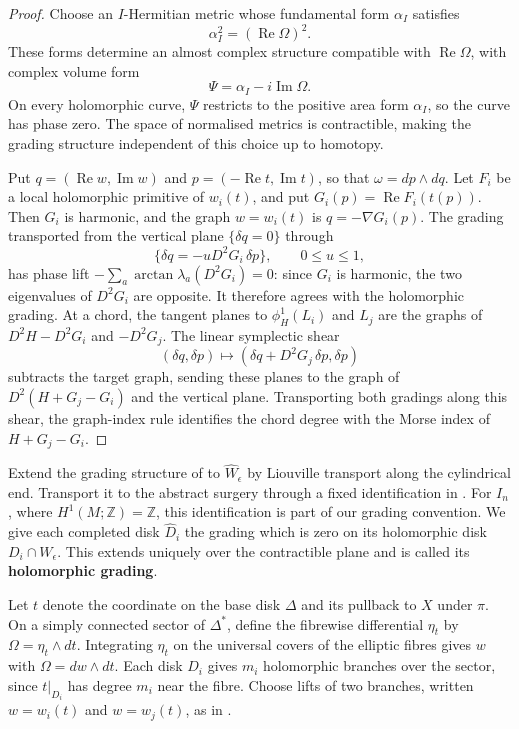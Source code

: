 \documentclass[a4paper]{amsart}
\newcommand{\ZZ}{\mathbb{Z}}
\DeclareMathOperator{\Ree}{Re}
\renewcommand{\Im}{\operatorname{Im}}
\numberwithin{equation}{section}
\begin{document}
\begin{proof}
Choose an $I$-Hermitian metric whose fundamental form $\alpha_I$ satisfies
\[
 \alpha_I^2=(\Ree\Omega)^2.
\]
These forms determine an almost complex structure compatible with
$\Ree\Omega$, with complex volume form
\[
 \Psi=\alpha_I-i\Im\Omega.
\]
On every holomorphic curve, $\Psi$ restricts to the positive area form
$\alpha_I$, so the curve has phase zero. The space of normalised metrics
is contractible, making the grading structure independent of this choice
up to homotopy.

Put $q=(\Ree w,\Im w)$ and $p=(-\Ree t,\Im t)$, so that
$\omega=dp\wedge dq$. Let $F_i$ be a local holomorphic primitive of
$w_i(t)$, and put $G_i(p)=\Ree F_i(t(p))$. Then $G_i$ is harmonic,
and the graph $w=w_i(t)$ is $q=-\nabla G_i(p)$.
The grading transported from the vertical plane $\{\delta q=0\}$ through
\[
 \{\delta q=-uD^2G_i\,\delta p\},\qquad 0\leq u\leq1,
\]
has phase lift $-\sum_a\arctan\lambda_a(D^2G_i)=0$: since $G_i$ is
harmonic, the two eigenvalues of $D^2G_i$ are opposite. It therefore
agrees with the holomorphic grading.
At a chord, the tangent planes to $\phi_H^1(L_i)$ and $L_j$ are
the graphs of $D^2H-D^2G_i$ and $-D^2G_j$. The linear symplectic shear
\[
 (\delta q,\delta p)\longmapsto
 (\delta q+D^2G_j\,\delta p,\delta p)
\]
subtracts the target graph, sending these planes to the graph of
$D^2(H+G_j-G_i)$ and the vertical plane. Transporting both gradings
along this shear, the graph-index rule
\cite[Section~2d, (iii)--(v)]{SeidelGraded} identifies the chord degree
with the Morse index of $H+G_j-G_i$.
\end{proof}

Extend the grading structure of  to
$\widehat W_\epsilon$ by Liouville transport along the cylindrical end.
Transport it to the abstract surgery through a fixed
identification in . For $I_n$, where
$H^1(M;\ZZ)=\ZZ$, this identification is part of our grading convention.
We give each completed disk $\widehat D_i$ the grading which is zero
on its holomorphic disk $D_i\cap W_\epsilon$. This extends uniquely
over the contractible plane and is called its \textbf{holomorphic grading}.

Let $t$ denote the coordinate on the base disk $\Delta$ and its
pullback to $X$ under $\pi$. On a simply connected sector of $\Delta^*$, define
the fibrewise differential $\eta_t$ by $\Omega=\eta_t\wedge dt$.
Integrating $\eta_t$ on the universal covers of the elliptic fibres
gives $w$ with $\Omega=dw\wedge dt$. Each disk $D_i$ gives $m_i$
holomorphic branches over the sector, since $t|_{D_i}$ has degree
$m_i$ near the fibre. Choose lifts of two branches, written
$w=w_i(t)$ and $w=w_j(t)$, as in .
\end{document}

